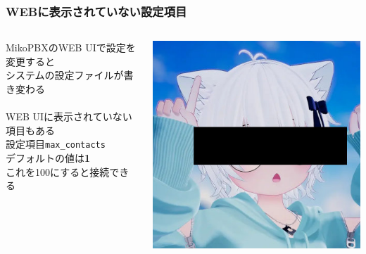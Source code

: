 \documentclass[
  lualatex,
  aspectratio=169,
  14pt
]{beamer}
\begin{document}
\begin{frame}
  \frametitle{WEBに表示されていない設定項目}

  \begin{columns}
    \begin{column}{.7\textwidth}
      MikoPBXのWEB UIで設定を変更すると\\
      \hspace{1.5\zw}システムの設定ファイルが書き変わる
      \\~\\[-.5\baselineskip]

      WEB UIに表示されていない項目もある\\
      \hspace{1.5\zw}設定項目\texttt{max\_contacts}\\
      \hspace{1.5\zw}デフォルトの値は\textbf{1}\\
      \hspace{1.5\zw}これを100にすると接続できる
    \end{column}
    \begin{column}{.29\textwidth}
      \includegraphics[width=\linewidth]{./images/jiminy.jpg}
    \end{column}
  \end{columns}
\end{frame}
\end{document}

